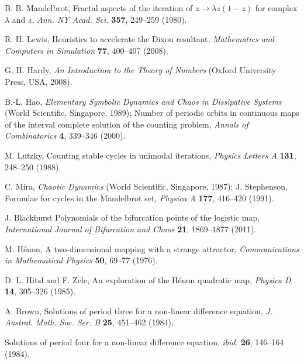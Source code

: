\documentclass[twocolumn]{revtex4-1}
\begin{document}
\begin{thebibliography}{50}
  B. B. Mandelbrot,
  Fractal aspects of the iteration of $z \rightarrow \lambda z(1-z)$
      for complex $\lambda$ and $z$,
  \textit{Ann. NY Acad. Sci.}
  \textbf{357},
  249--259
  (1980).

  R. H. Lewis,
  Heuristics to accelerate the Dixon resultant,
  \textit{Mathematics and Computers in Simulation}
  \textbf{77},
  400--407
  (2008).

 G. H. Hardy,
  \textit{An Introduction to the Theory of Numbers}
  (Oxford University Press, USA, 2008).

 B.-L. Hao,
  \textit{Elementary Symbolic Dynamics and Chaos in  Dissipative Systems}
  (World Scientific, Singapore, 1989);
  Number of periodic orbits in continuous maps of
    the interval complete solution of the counting problem,
  \textit{Annals of Combinatorics}
  \textbf{4},
  339--346
  (2000).

 M. Lutzky,
  Counting stable cycles in unimodal iterations,
  \textit{Physics Letters A}
  \textbf{131},
  248--250
  (1988).

  C. Mira,
  \textit{Chaotic Dynamics}
  (World Scientific, Singapore, 1987);
  J. Stephenson,
  Formulae for cycles in the Mandelbrot set,
  \textit{Physica A}
  \textbf{177},
  416--420
  (1991).

  J. Blackhurst
  Polynomials of the bifurcation points of the logistic map,
  \textit{International Journal of Bifurcation and Chaos}
  \textbf{21},
  1869--1877
  (2011).

  M. H\'enon,
  A two-dimensional mapping with a strange attractor,
  \textit{Communications in Mathematical Physics}
  \textbf{50},
  69--77
  (1976).

  D. L. Hitzl and F. Zele,
  An exploration of the H\'enon quadratic map,
  \textit{Physica D}
  \textbf{14},
  305--326
  (1985).

  A. Brown,
  Solutions of period three for a non-linear difference equation,
  \textit{J. Austral. Math. Soc. Ser. B}
  \textbf{25},
  451--462
  (1984);

  Solutions of period four for a non-linear difference equation,
  \textit{ibid.}
  \textbf{26},
  146--164
  (1984).

\end{thebibliography}
\end{document}
